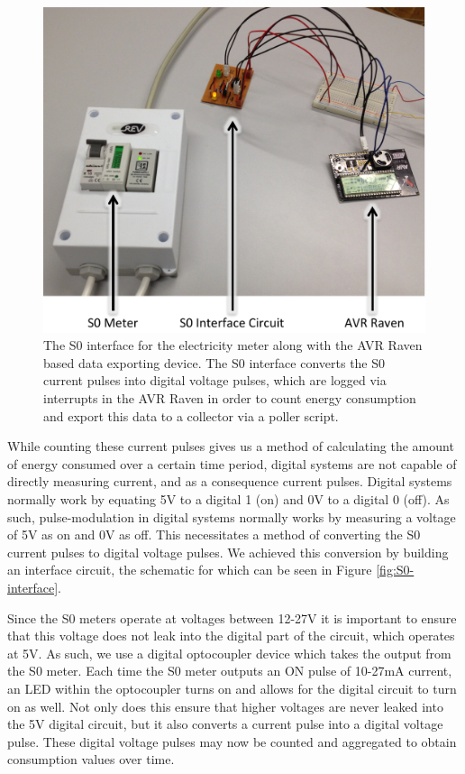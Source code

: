 \documentclass[10pt, conference, compsocconf, english]{IEEEtran}
\begin{document}
\begin{figure}[t]
\begin{centering}
\includegraphics[scale=0.4]{images/s0-meter} 
\par\end{centering}

\caption{The S0 interface for the electricity meter along with the AVR Raven
based data exporting device. The S0 interface converts the S0 current
pulses into digital voltage pulses, which are logged via interrupts
in the AVR Raven in order to count energy consumption and export this
data to a collector via a poller script.\label{fig:meter-overview}}
\end{figure}


While counting these current pulses gives us a method of calculating
the amount of energy consumed over a certain time period, digital
systems are not capable of directly measuring current, and as a consequence
current pulses. Digital systems normally work by equating 5V to a
digital 1 (on) and 0V to a digital 0 (off). As such, pulse-modulation
in digital systems normally works by measuring a voltage of 5V as
on and 0V as off. This necessitates a method of converting the S0
current pulses to digital voltage pulses. We achieved this conversion
by building an interface circuit, the schematic for which can be seen
in Figure \ref{fig:S0-interface}.

Since the S0 meters operate at voltages between 12-27V it is important
to ensure that this voltage does not leak into the digital part of
the circuit, which operates at 5V. As such, we use a digital optocoupler
device which takes the output from the S0 meter. Each time the S0
meter outputs an ON pulse of 10-27mA current, an LED within the optocoupler
turns on and allows for the digital circuit to turn on as well. Not
only does this ensure that higher voltages are never leaked into the
5V digital circuit, but it also converts a current pulse into a digital
voltage pulse. These digital voltage pulses may now be counted and
aggregated to obtain consumption values over time.
\end{document}

